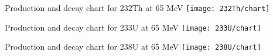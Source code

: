 \documentclass[10pt]{beamer}
\begin{document}
\begin{frame}{\small Production and decay chart for 232Th at 65 MeV}
	\centering
	\texttt{[image: 232Th/chart]}\\
\end{frame}

\begin{frame}{\small Production and decay chart for 233U at 65 MeV}
	\centering
	\texttt{[image: 233U/chart]}\\
\end{frame}

\begin{frame}{\small Production and decay chart for 238U at 65 MeV}
	\centering
	\texttt{[image: 238U/chart]}\\
\end{frame}
\end{document}
